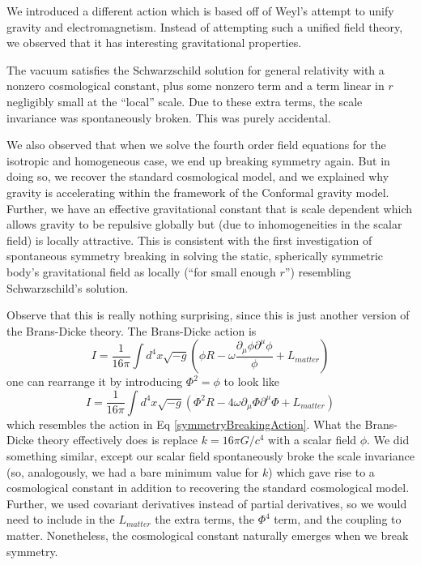 We introduced a different action which is based off of Weyl's attempt
to unify gravity and electromagnetism. Instead of attempting such a
unified field theory, we observed that it has interesting
gravitational properties. 

The vacuum satisfies the Schwarzschild solution for general relativity
with a nonzero cosmological constant, plus some nonzero term and a
term linear in $r$ negligibly small at the ``local'' scale. Due to
these extra terms, the scale invariance was spontaneously broken. This
was purely accidental.

We also observed that when we solve the fourth order field equations
for the isotropic and homogeneous case, we end up breaking symmetry
again. But in doing so, we recover the standard cosmological model,
and we explained why gravity is accelerating within the framework of
the Conformal gravity model. Further, we have an effective
gravitational constant that is scale dependent which allows gravity to
be repulsive globally but (due to inhomogeneities in the scalar field)
is locally attractive. This is consistent with the first investigation
of spontaneous symmetry breaking in solving the static, spherically
symmetric body's gravitational field as locally (``for small enough
$r$'') resembling Schwarzschild's solution.

Observe that this is really nothing surprising, since this is just
another version of the Brans-Dicke theory. The Brans-Dicke action is
\begin{equation}
I = \frac{1}{16\pi}\int d^{4}x\sqrt{-g}\left(\phi R
- \omega \frac{\partial_{\mu}\phi\partial^{\mu}\phi}{\phi} + L_{matter}\right)
\end{equation}
one can rearrange it by introducing $\Phi^2=\phi$ to look like
\begin{equation}
I = \frac{1}{16\pi}\int d^{4}x\sqrt{-g}\left(\Phi^2R -
4\omega\partial_\mu\Phi\partial^{\mu}\Phi + L_{matter}\right)
\end{equation}
which resembles the action in Eq \eqref{symmetryBreakingAction}. What
the Brans-Dicke theory effectively does is replace $k=16\pi G/c^4$
with a scalar field $\phi$. We did something similar, except our
scalar field spontaneously broke the scale invariance (so,
analogously, we had a bare minimum value for $k$) which gave rise
to a cosmological constant in addition to recovering the standard
cosmological model. Further, we used covariant derivatives instead of
partial derivatives, so we would need to include in the $L_{matter}$
the extra terms, the $\Phi^4$ term, and the coupling to
matter. Nonetheless, the cosmological constant naturally emerges when
we break symmetry. 
